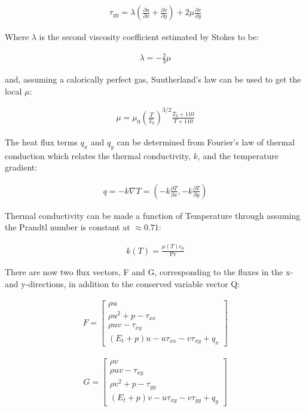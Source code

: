 \documentclass[10pt,a4paper]{article}
\begin{document}
\begin{align*}
\tau_{yy} = \lambda \left( \frac{\partial u}{\partial x} + \frac{\partial v}{\partial y} \right) + 2 \mu \frac{\partial v}{\partial y}
\end{align*}

Where $\lambda$ is the second viscosity coefficient estimated by Stokes to be:

\begin{align*}
\lambda = -\frac{2}{3} \mu
\end{align*}

and, assuming a calorically perfect gas, Suutherland's law can be used to get the local $\mu$:

\begin{align*}
\mu = \mu_0 \left( \frac{T}{T_0} \right)^{3/2} \frac{T_0 + 110}{T + 110}
\end{align*}


The heat flux terms $q_x$ and $q_y$ can be determined from Fourier's law of thermal conduction which relates the thermal conductivity, $k$, and the temperature gradient:

\begin{align*}
q = -k \nabla T = \left( -k\frac{\partial T}{\partial x}, -k\frac{\partial T}{\partial y} \right)
\end{align*}

Thermal conductivity can be made a function of Temperature through assuming the Prandtl number is constant at $\approx 0.71$:

\begin{align*}
k(T) = \frac{\mu (T) c_p }{\text{Pr}}
\end{align*}






There are now two flux vectors, F and G, corresponding to the fluxes in the x- and y-directions, in addition to the conserved variable vector Q:

\begin{align*}
F = 
\begin{bmatrix} 
\rho u \\
\rho u^2 + p - \tau_{xx}\\
\rho u v - \tau_{xy}\\
(E_t + p) u - u \tau_{xx} - v \tau_{xy} + q_x
\end{bmatrix}
\end{align*}


\begin{align*}
G = 
\begin{bmatrix} 
\rho v \\
\rho u v - \tau_{xy}\\
\rho v^2 + p - \tau_{yy}\\
(E_t + p) v - u \tau_{xy} - v \tau_{yy} + q_y
\end{bmatrix}
\end{align*}
\end{document}

